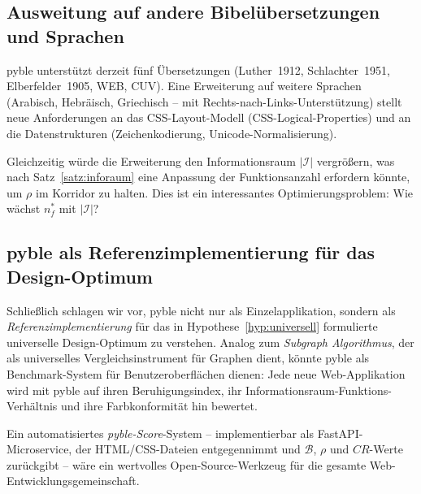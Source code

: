 ﻿\documentclass[a4paper,12pt]{article}
\theoremstyle{definition}
\begin{document}
\subsection{Ausweitung auf andere Bibelübersetzungen und Sprachen}

pyble unterstützt derzeit fünf Übersetzungen (Luther~1912, Schlachter~1951,
Elberfelder~1905, WEB, CUV). Eine Erweiterung auf weitere Sprachen
(Arabisch, Hebräisch, Griechisch -- mit Rechts-nach-Links-Unterstützung)
stellt neue Anforderungen an das CSS-Layout-Modell (CSS-Logical-Properties)
und an die Datenstrukturen (Zeichenkodierung, Unicode-Normalisierung).

Gleichzeitig würde die Erweiterung den Informationsraum $|\mathcal{I}|$
vergrößern, was nach Satz~\ref{satz:inforaum} eine Anpassung der
Funktionsanzahl erfordern könnte, um $\rho$ im Korridor zu halten.
Dies ist ein interessantes Optimierungsproblem: Wie wächst $n_f^*$ mit
$|\mathcal{I}|$?

\subsection{pyble als Referenzimplementierung für das Design-Optimum}

Schließlich schlagen wir vor, pyble nicht nur als Einzelapplikation,
sondern als \emph{Referenzimplementierung} für das in Hypothese~\ref{hyp:universell}
formulierte universelle Design-Optimum zu verstehen. Analog zum
\emph{Subgraph Algorithmus}, der als universelles Vergleichsinstrument
für Graphen dient, könnte pyble als Benchmark-System für Benutzeroberflächen
dienen: Jede neue Web-Applikation wird mit pyble auf ihren Beruhigungsindex,
ihr Informationsraum-Funktions-Verhältnis und ihre Farbkonformität hin
bewertet.

Ein automatisiertes \emph{pyble-Score}-System -- implementierbar als
FastAPI-Microservice, der HTML/CSS-Dateien entgegennimmt und $\mathcal{B}$,
$\rho$ und $CR$-Werte zurückgibt -- wäre ein wertvolles Open-Source-Werkzeug
für die gesamte Web-Entwicklungsgemeinschaft.
\end{document}
